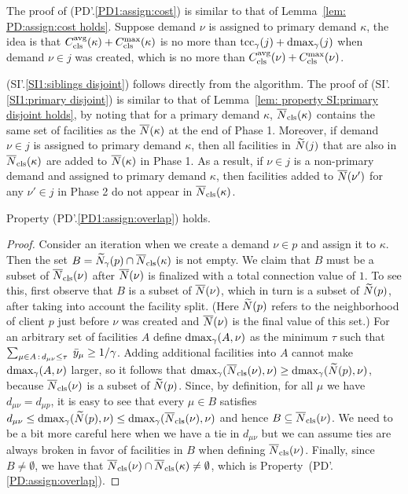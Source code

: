 The proof of (PD'.\ref{PD1:assign:cost}) is similar to that of
Lemma~\ref{lem: PD:assign:cost holds}. Suppose demand $\nu$ is
assigned to primary demand $\kappa$, the idea is that
$C_{\text{cls}}^{{\mbox{\scriptsize\rm avg}}}(\kappa) + C_{\text{cls}}^{\max}(\kappa)$ is no more than $\textrm{tcc}_\gamma(j) +
\text{dmax}_{\gamma}(j)$ when demand $\nu \in j$ was created, which is no
more than $C_{\text{cls}}^{{\mbox{\scriptsize\rm avg}}}(\nu) + C_{\text{cls}}^{\max}(\nu)$.

(SI'.\ref{SI1:siblings disjoint}) follows directly from the
algorithm. The proof of (SI'.\ref{SI1:primary disjoint}) is similar to
that of Lemma~\ref{lem: property SI:primary disjoint holds}, by noting
that for a primary demand $\kappa$, ${\overline{N}}_{\text{cls}}(\kappa)$ contains the
same set of facilities as the ${\overline{N}}(\kappa)$ at the end of Phase
1. Moreover, if demand $\nu\in j$ is assigned to primary demand
$\kappa$, then all facilities in ${\widetilde N}(j)$ that are also in
${\overline{N}}_{\text{cls}}(\kappa)$ are added to ${\overline{N}}(\kappa)$ in Phase 1. As a
result, if $\nu \in j$ is a non-primary demand and assigned to primary
demand $\kappa$, then facilities added to ${\overline{N}}(\nu')$ for any
$\nu'\in j$ in Phase 2 do not appear in ${\overline{N}}_{\text{cls}}(\kappa)$.


\begin{lemma} \label{lem: PD1: primary overlap}
  Property (PD'.\ref{PD1:assign:overlap}) holds.
\end{lemma}
\begin{proof}
Consider an iteration when we create a demand $\nu\in p$ and assign it
to $\kappa$. Then the set $B={\widetilde N}_{\gamma}(p)\cap
{\overline{N}}_{\text{cls}}(\kappa)$ is not empty.  We claim that $B$ must be a subset
of ${\overline{N}}_{\text{cls}}(\nu)$ after ${\overline{N}}(\nu)$ is finalized with a total
connection value of $1$. To see this, first observe that $B$ is a
subset of ${\overline{N}}(\nu)$, which in turn is a subset of ${\widetilde N}(p)$,
after taking into account the facility split. (Here ${\widetilde N}(p)$
refers to the neighborhood of client $p$ just before $\nu$ was created
and ${\overline{N}}(\nu)$ is the final value of this set.)  For an arbitrary
set of facilities $A$ define $\text{dmax}_\gamma(A, \nu)$ as the minimum
$\tau$ such that $\sum_{\mu\in A {\,:\,} d_{\mu\nu} \leq
  \tau}\;{\bar y}_{\mu} \geq 1/\gamma$.  Adding additional facilities
into $A$ cannot make $\text{dmax}_\gamma(A, \nu)$ larger, so it follows that
$\text{dmax}_\gamma ({\overline{N}}_{\text{cls}}(\nu), \nu) \geq \text{dmax}_\gamma({\widetilde N}(p),
\nu)$, because ${\overline{N}}_{\text{cls}}(\nu)$ is a subset of ${\widetilde N}(p)$. Since,
by definition, for all $\mu$ we have $d_{\mu \nu} = d_{\mu p}$, it is
easy to see that every $\mu \in B$ satisfies $d_{\mu \nu} \leq
\text{dmax}_\gamma({\widetilde N}(p), \nu) \leq \text{dmax}_\gamma({\overline{N}}_{\text{cls}}(\nu),
\nu)$ and hence $B\subseteq {\overline{N}}_{\text{cls}}(\nu)$. We need to be a bit more
careful here when we have a tie in $d_{\mu\nu}$ but we can assume ties
are always broken in favor of facilities in $B$ when defining
${\overline{N}}_{\text{cls}}(\nu)$. Finally, since $B\neq\emptyset$, we have that
${\overline{N}}_{\text{cls}}(\nu)\cap {\overline{N}}_{\text{cls}}(\kappa)\neq\emptyset$, which is
Property~(PD'.\ref{PD:assign:overlap}).
\end{proof}


